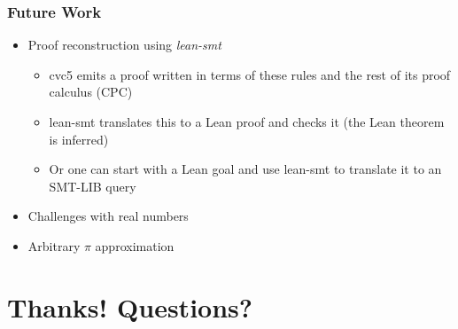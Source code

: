 \documentclass[usepdftitle=false,aspectratio=169,usenames,dvipsnames]{beamer}
\newcommand\vitem{\vfill\item}
\begin{document}
\begin{frame}
  \frametitle{Future Work}
  \begin{itemize}
    \item Proof reconstruction using \textit{lean-smt}
          \begin{itemize}
                  \item cvc5 emits a proof written in terms of these rules and the rest of its proof calculus (CPC)
                  \item lean-smt translates this to a Lean proof and checks it (the Lean theorem is inferred)
                  \item Or one can start with a Lean goal and use lean-smt to translate it to an SMT-LIB query
          \end{itemize}
    \pause
    \vitem Challenges with real numbers
    \pause
    \vitem Arbitrary $\pi$ approximation
  \end{itemize}
\end{frame}

\section{Thanks! Questions?}
\end{document}
